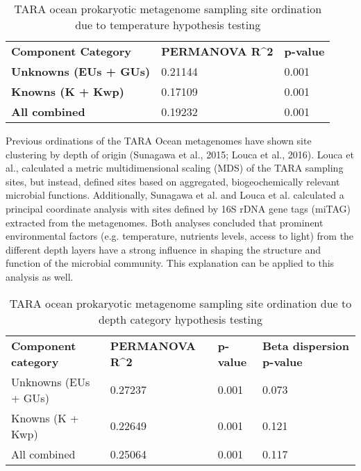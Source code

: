 \begin{table}[]
\centering
\caption{TARA ocean prokaryotic metagenome sampling site ordination due to temperature hypothesis testing}
\label{my-label}
\begin{tabular}{lll}
\textbf{Component Category}   & \textbf{PERMANOVA R\textasciicircum 2} & \textbf{p-value} \\
\textbf{Unknowns (EUs + GUs)} & 0.21144                                & 0.001            \\
\textbf{Knowns (K + Kwp)}     & 0.17109                                & 0.001            \\
\textbf{All combined}         & 0.19232                                & 0.001           
\end{tabular}
\end{table}

Previous ordinations of the TARA Ocean metagenomes have shown site clustering by depth of origin (Sunagawa et al., 2015; Louca et al., 2016). Louca et al., calculated a metric multidimensional scaling (MDS) of the TARA sampling sites, but instead, defined sites based on aggregated, biogeochemically relevant microbial functions. Additionally, Sunagawa et al. and Louca et al. calculated a principal coordinate analysis with sites defined by 16S rDNA gene tags (miTAG) extracted from the metagenomes. Both analyses concluded that prominent environmental factors (e.g. temperature, nutrients levels, access to light) from the different depth layers have a strong influence in shaping the structure and function of the microbial community. This explanation can be applied to this analysis as well.

\begin{table}[]
\centering
\caption{TARA ocean prokaryotic metagenome sampling site ordination due to depth category hypothesis testing}
\label{my-label}
\begin{tabular}{llll}
\textbf{Component category} & \textbf{PERMANOVA R\textasciicircum 2} & \textbf{p-value} & \textbf{Beta dispersion p-value} \\
Unknowns (EUs + GUs) & 0.27237 & 0.001 & 0.073 \\
Knowns (K + Kwp) & 0.22649 & 0.001 & 0.121 \\
All combined & 0.25064 & 0.001 & 0.117
\end{tabular}
\end{table}

